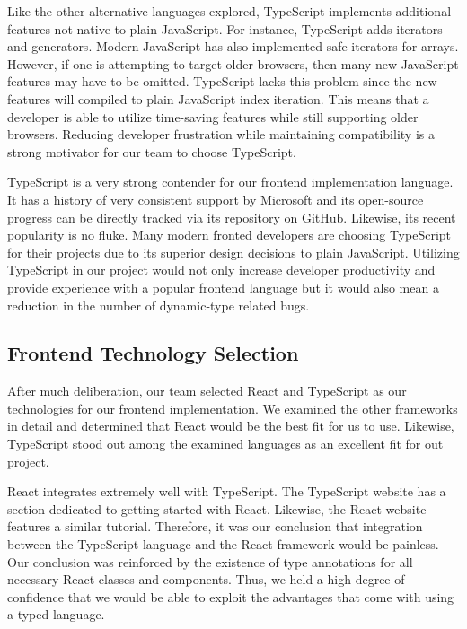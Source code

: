 \documentclass[12pt]{report}
\begin{document}
Like the other alternative languages explored, TypeScript implements additional features not native to plain JavaScript. For instance, TypeScript adds iterators and generators. Modern JavaScript has also implemented safe iterators for arrays. However, if one is attempting to target older browsers, then many new JavaScript features may have to be omitted. TypeScript lacks this problem since the new features will compiled to plain JavaScript index iteration. This means that a developer is able to utilize time-saving features while still supporting older browsers. Reducing developer frustration while maintaining compatibility is a strong motivator for our team to choose TypeScript.

TypeScript is a very strong contender for our frontend implementation language. It has a history of very consistent support by Microsoft and its open-source progress can be directly tracked via its repository on GitHub. Likewise, its recent popularity is no fluke. Many modern fronted developers are choosing TypeScript for their projects due to its superior design decisions to plain JavaScript. Utilizing TypeScript in our project would not only increase developer productivity and provide experience with a popular frontend language but it would also mean a reduction in the number of dynamic-type related bugs.

\subsection*{Frontend Technology Selection}

After much deliberation, our team selected React and TypeScript as our technologies for our frontend implementation. We examined the other frameworks in detail and determined that React would be the best fit for us to use. Likewise, TypeScript stood out among the examined languages as an excellent fit for out project.

React integrates extremely well with TypeScript. The TypeScript website has a section dedicated to getting started with React.\cite{typescriptreacttutorial} Likewise, the React website features a similar tutorial.\cite{reacttypescripttutorial} Therefore, it was our conclusion that integration between the TypeScript language and the React framework would be painless. Our conclusion was reinforced by the existence of type annotations for all necessary React classes and components. Thus, we held a high degree of confidence that we would be able to exploit the advantages that come with using a typed language.
\end{document}
